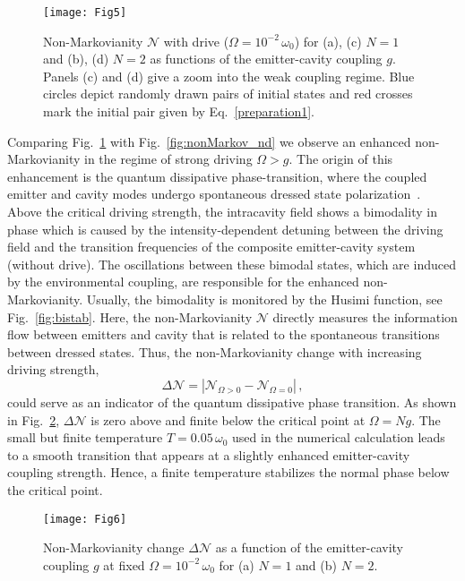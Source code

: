 \documentclass[aps,pra,twocolumn,showpacs,showkeys,10pt,nofootinbib]{revtex4-1}
\begin{document}
\begin{figure}
  \texttt{[image: Fig5]}
  \caption{\label{fig:nonMarkov_wd}Non-Markovianity $\mathcal{N}$ with drive ($\Omega=10^{-2}\,\omega_0$) for (a), (c) $N=1$ and (b), (d) $N=2$ as functions of the emitter-cavity coupling $g$.
    Panels (c) and (d) give a zoom into the weak coupling regime.
    Blue circles depict randomly drawn pairs of initial states and red crosses mark the initial pair given by Eq.~\eqref{preparation1}.}
\end{figure}

Comparing Fig.~\ref{fig:nonMarkov_wd} with Fig.~\ref{fig:nonMarkov_nd} we observe an enhanced non-Markovianity in the regime of strong driving $\Omega>g$.
The origin of this enhancement is the quantum dissipative phase-transition, where the coupled emitter and cavity modes undergo spontaneous dressed state polarization~\cite{sc88, ac91, car15}.
Above the critical driving strength, the intracavity field shows a bimodality in phase which is caused by the intensity-dependent detuning between the driving field and the transition frequencies of the composite emitter-cavity system (without drive).
The oscillations between these bimodal states, which are induced by the environmental coupling, are responsible for the enhanced non-Markovianity.
Usually, the bimodality is monitored by the Husimi function, see Fig.~\ref{fig:bistab}.
Here, the non-Markovianity $\mathcal{N}$ directly measures the information flow between emitters and cavity that is related to the spontaneous transitions between dressed states.
Thus, the non-Markovianity change with increasing driving strength,
\begin{equation}
  \Delta \mathcal{N} = |\mathcal{N}_{\Omega>0} - \mathcal{N}_{\Omega=0}| \,,
\end{equation}
could serve as an indicator of the quantum dissipative phase transition.
As shown in Fig.~\ref{fig:deltaN}, $\Delta\mathcal{N}$ is zero above and finite below the critical point at $\Omega=Ng$.
The small but finite temperature $T = 0.05 \, \omega_0$ used in the numerical calculation leads to a smooth transition that appears at a slightly enhanced emitter-cavity coupling strength.
Hence, a finite temperature stabilizes the normal phase below the critical point.

\begin{figure}
  \texttt{[image: Fig6]}
  \caption{\label{fig:deltaN}Non-Markovianity change $\Delta\mathcal{N}$ as a function of the emitter-cavity coupling $g$ at fixed $\Omega=10^{-2}\,\omega_0$ for (a) $N=1$ and (b) $N=2$.}
\end{figure}
\end{document}
